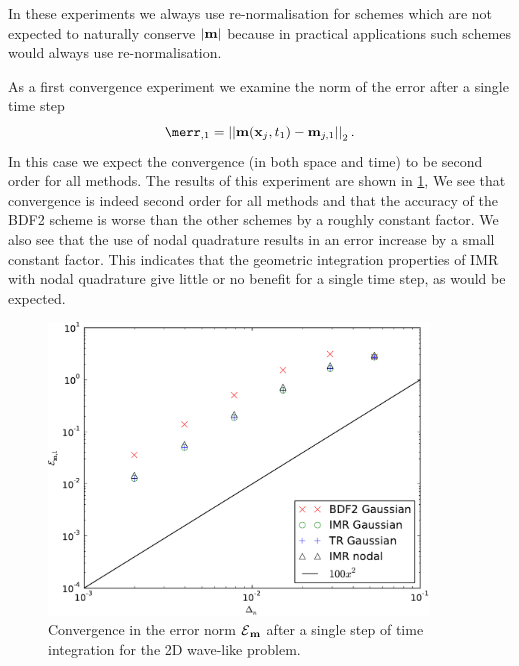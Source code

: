 In these experiments we always use re-normalisation for schemes which are not expected to naturally conserve $\left|{\boldsymbol{\mathrm{m}}} \right|$ because in practical applications such schemes would always use re-normalisation.

As a first convergence experiment we examine the norm of the error after a single time step
\begin{equation}
  \merr_{,1} = \norm{\mv(\xv_j, t_1) - \mv_{j,1}}_2.
\end{equation}
In this case we expect the convergence (in both space and time) to be second order for all methods.
The results of this experiment are shown in \cref{fig:convergence-one-step},
We see that convergence is indeed second order for all methods and that the accuracy of the BDF2 scheme is worse than the other schemes by a roughly constant factor.
We also see that the use of nodal quadrature results in an error increase by a small constant factor.
This indicates that the geometric integration properties of IMR with nodal quadrature give little or no benefit for a single time step, as would be expected.
\begin{figure}
  \centering
  \includegraphics[width=0.9\textwidth]{plots/2d_wave_solution_convergence_long_time/firstoferrornormsvsfakemeanofdts.pdf}
  \caption{Convergence in the error norm $\mathcal{E}{}_{\boldsymbol{\mathrm{m}}}{}$ after a single step of time integration for the 2D wave-like problem.}
  \label{fig:convergence-one-step}
\end{figure}



